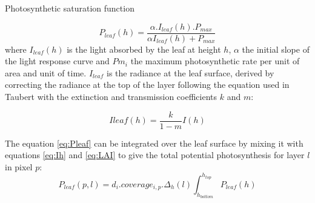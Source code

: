 \documentclass[a4paper,twoside, justified,marginals=raggedright, nobib]{tufte-handout}
\begin{document}
\begin{marginfigure}
\label{fig:derivaives}
\caption{Photosynthetic saturation function}
\end{marginfigure}

\begin{equation}\label{eq:Pleaf}
P_{leaf}(h) = \frac{\alpha. I_{leaf}(h).P_{max}}{\alpha I_{leaf}(h)+P_{max}}
\end{equation}
where $I_{leaf}(h)$ is the light absorbed by the leaf at height $h$, $\alpha$ the initial slope of the light response curve and $Pm_{i}$ the maximum photosynthetic rate per unit of area and unit of time.
$I_{leaf}$ is the radiance at the leaf surface, derived by correcting the radiance at the top of the layer following the equation used in Taubert with the extinction and transmission coefficients $k$ and $m$:

\begin{equation}
I{leaf}(h) = \frac{k}{1-m}I(h)
\end{equation}

The equation \eqref{eq:Pleaf} can be integrated over the leaf surface by mixing it with equations \eqref{eq:Ih} and \eqref{eq:LAI} to give the total potential photosynthesis for layer $l$ in pixel $p$:
\begin{equation}\label{Ppixlay}
P_{leaf}(p,l) = d_{i}.coverage_{i, p}.\Delta_{h}(l)\int_{h_{bottom}}^{h_{top}}P_{leaf}(h)
\end{equation}
%
\end{document}
